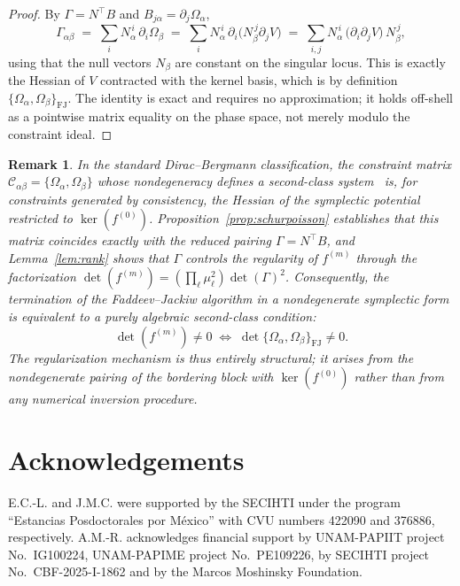 \documentclass[11pt,a4paper]{article}
\newtheorem{remark}{Remark}
\begin{document}
\begin{proof}
	By $\Gamma = N^{\top}B$ and $B_{j\alpha}=\partial_j\Omega_\alpha$,
	\[
	\Gamma_{\alpha\beta} \;=\; \sum_{i} N_\alpha^{\,i}\,\partial_i\Omega_\beta \;=\; \sum_{i} N_\alpha^{\,i}\,\partial_i\bigl(N_\beta^{\,j}\partial_j V\bigr) \;=\; \sum_{i,j} N_\alpha^{\,i}\,\bigl(\partial_i\partial_j V\bigr)\,N_\beta^{\,j},
	\]
	using that the null vectors $N_\beta$ are constant on the singular locus. This is exactly the Hessian of $V$ contracted with the kernel basis, which is by definition $\{\Omega_\alpha,\Omega_\beta\}_{\mathrm{FJ}}$. The identity is exact and requires no approximation; it holds off-shell as a pointwise matrix equality on the phase space, not merely modulo the constraint ideal.
\end{proof}

\begin{remark}
	In the standard Dirac--Bergmann classification, the constraint matrix $\mathcal{C}_{\alpha\beta} = \{\Omega_\alpha, \Omega_\beta\}$ whose nondegeneracy defines a second-class system~\cite{Dirac1964,Henneaux1992,GitmanTyutin1990} is, for constraints generated by consistency, the Hessian of the symplectic potential restricted to $\ker(f^{(0)})$. Proposition~\ref{prop:schurpoisson} establishes that this matrix coincides exactly with the reduced pairing $\Gamma = N^{\top}B$, and Lemma~\ref{lem:rank} shows that $\Gamma$ controls the regularity of $f^{(m)}$ through the factorization $\det(f^{(m)}) = (\prod_\ell\mu_\ell^2)\det(\Gamma)^2$. Consequently, the termination of the Faddeev--Jackiw algorithm in a nondegenerate symplectic form is equivalent to a purely algebraic second-class condition:
	\[
	\det(f^{(m)}) \neq 0 \;\iff\; \det\{\Omega_\alpha, \Omega_\beta\}_{\mathrm{FJ}} \neq 0.
	\]
	The regularization mechanism is thus entirely structural; it arises from the nondegenerate pairing of the bordering block with $\ker(f^{(0)})$ rather than from any numerical inversion procedure.
\end{remark}

\section*{Acknowledgements}

E.C.-L. and J.M.C. were supported by the SECIHTI under the program ``Estancias Posdoctorales por México'' with CVU numbers 422090 and 376886, respectively. A.M.-R. acknowledges financial support by UNAM-PAPIIT project No.~IG100224, UNAM-PAPIME project No.~PE109226, by SECIHTI project No.~CBF-2025-I-1862 and by the Marcos Moshinsky Foundation.
\end{document}
